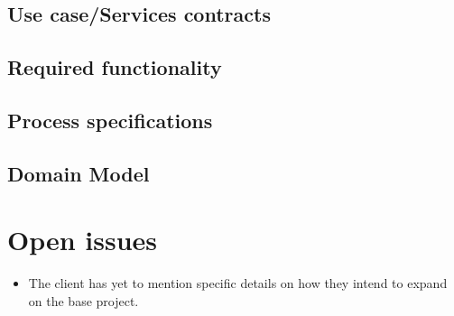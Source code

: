 \documentclass[a4paper,12pt]{report}
\begin{document}
	\subsection{Use case/Services contracts}
	\subsection{Required functionality}
	\subsection{Process specifications}
	\subsection{Domain Model}

\section{Open issues}
	\begin{itemize}
		\item The client has yet to mention specific details on how they intend to expand on the base project.
	\end{itemize}




\end{document}
